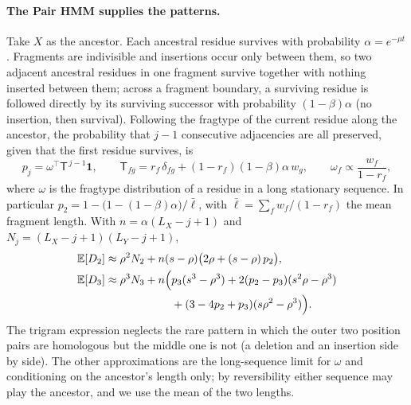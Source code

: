 \documentclass[11pt]{article}
\newcommand{\E}{\mathbb E}
\begin{document}
\paragraph{The Pair HMM supplies the patterns.} Take $X$ as the ancestor.
Each ancestral residue survives with probability $\alpha=e^{-\mu t}$.
Fragments are indivisible and insertions occur only between them, so two
adjacent ancestral residues in one fragment survive together with nothing
inserted between them; across a fragment boundary, a surviving residue is
followed directly by its surviving successor with probability
$(1-\beta)\alpha$ (no insertion, then survival). Following the fragtype of the
current residue along the ancestor, the probability that $j-1$ consecutive
adjacencies are all preserved, given that the first residue survives, is
\[
p_j=\omega^\top\mathsf T^{\,j-1}\mathbf 1,\qquad
\mathsf T_{fg}=r_f\,\delta_{fg}+(1-r_f)(1-\beta)\alpha\,w_g,\qquad
\omega_f\propto\frac{w_f}{1-r_f},
\]
where $\omega$ is the fragtype distribution of a residue in a long stationary
sequence. In particular $p_2=1-\big(1-(1-\beta)\alpha\big)/\bar\ell$, with
$\bar\ell=\sum_fw_f/(1-r_f)$ the mean fragment length. With
$n=\alpha(L_X-j+1)$ and $N_j=(L_X-j+1)(L_Y-j+1)$,
\begin{align}
\E[D_2]&\approx\rho^2N_2+n(s-\rho)\big(2\rho+(s-\rho)\,p_2\big),\label{eq:d2}\\
\E[D_3]&\approx\rho^3N_3+n\Big(p_3(s^3-\rho^3)+2(p_2-p_3)(s^2\rho-\rho^3)\notag\\
 &\hphantom{{}\approx\rho^3N_3+n\Big(}+(3-4p_2+p_3)(s\rho^2-\rho^3)\Big).\label{eq:d3}
\end{align}
The trigram expression neglects the rare pattern in which the outer two
position pairs are homologous but the middle one is not (a deletion and an
insertion side by side). The other approximations are the long-sequence limit
for $\omega$ and conditioning on the ancestor's length only; by reversibility
either sequence may play the ancestor, and we use the mean of the two lengths.
\end{document}
